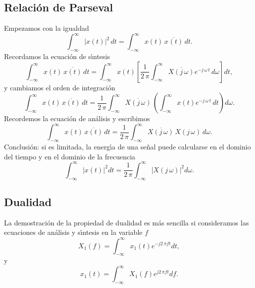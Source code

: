 \subsection{Relaci\'{o}n de Parseval}

Empezamos con la igualdad
\begin{equation}
\int_{-\infty }^{\infty }
  \left| x\left( t\right) \right|^{2} \, dt=
  \int_{-\infty }^{\infty }x\left( t\right) \, \overline{x^{ }\left(
      t\right)} \, dt.
\end{equation}
Recordamos la ecuaci\'{o}n de s\'{\i}ntesis 
\begin{equation}
\int_{-\infty }^{\infty }x\left( t\right) \, \overline{x\left( t\right)}
\, dt=
  \int_{-\infty }^{\infty }
    x\left( t\right) 
    \left[\frac{1}{2 \, \pi }\int_{-\infty }^{\infty }\overline{X\left(
          j \, \omega \right)} e^{-j \, \omega \, t} \, d\omega \right]
  dt,
\end{equation}
y cambiamos el orden de integraci\'{o}n 
\begin{equation}
\int_{-\infty }^{\infty }x\left( t\right) \, \overline{x\left(
    t\right)} \, dt=
\frac{1}{2 \, \pi }\int_{-\infty }^{\infty }\overline{X\left( j \, \omega
  \right)} \, \left(
\int_{-\infty }^{\infty }x\left( t\right) e^{-j \, \omega \, t} \, dt\right) d\omega .
\end{equation}
Recordemos la ecuaci\'{o}n de an\'{a}lisis y escribimos 
\begin{equation}
\int_{-\infty }^{\infty }x\left( t\right) \, \overline{x\left(
    t\right)} \, dt=
\frac{1}{2 \, \pi }\int_{-\infty }^{\infty }\overline{X\left( j \, \omega
  \right)} \, X\left(j \, \omega \right) \, d\omega .
\end{equation}
Conclusi\'{o}n: si es limitada, la energ\'{\i}a de una se\~{n}al puede calcularse en el dominio del tiempo
y en el dominio de la frecuencia
\begin{equation}
        \int_{-\infty }^{\infty }\left| x\left( t\right) \right| ^{2}dt=
        \frac{1}{2 \, \pi }\int_{-\infty }^{\infty }\left| X\left( j \, \omega \right) \right|^{2}d\omega .
\end{equation}

\subsection{Dualidad}

La demostraci\'{o}n de la propiedad de dualidad es m\'{a}s sencilla si consideramos las ecuaciones de 
an\'{a}lisis y s\'{\i}ntesis en la variable $f$
\begin{equation}
  X_{1}\left( f\right) =\int_{-\infty }^{\infty }x_{1}\left( t\right) e^{-j2 \, \pi ft}dt,    \label{anaFouDua}
\end{equation}
y 
\begin{equation}
  x_{1}\left( t\right) =\int_{-\infty }^{\infty }X_{1}\left( f\right) e^{j2 \, \pi ft}df.     \label{sinFouDua}
\end{equation}


